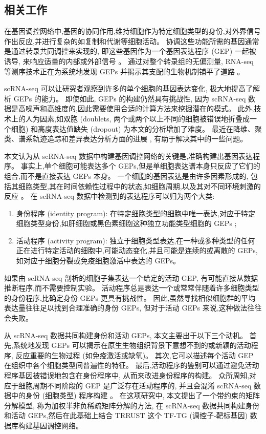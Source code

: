 \subsection{相关工作}
在基因调控网络中,基因的协同作用,维持细胞作为特定细胞类型的身份,对外界信号作出反应,并进行复杂的如复制和代谢等细胞活动。
协调这些功能所需的基因通常是通过转录共同调控来实现的,
即这些基因作为一个基因表达程序 (GEP) 一起被诱导,
来响应适量的内部或外部信号 。
通过对整个转录组的无偏测量, RNA-seq 等测序技术正在为系统地发现 GEPs 并揭示其支配的生物机制铺平了道路 。

scRNA-seq 可以让研究者观察到许多的单个细胞的基因表达变化,
极大地提高了解析 GEPs 的能力。
即使如此, GEPs 的构建仍然具有挑战性,
因为 scRNA-seq 数据是高噪声和高维度的,因此需要使用合适的计算方法来挖掘潜在的模式。
此外,技术上的人为因素,如双胞 (doublets, 两个或两个以上不同的细胞被错误地折叠成一个细胞) 和高度表达值缺失 (dropout) 为本文的分析增加了难度。
最近在降维、聚类、谱系轨迹追踪和差异表达分析方面的进展 ,
有助于解决其中的一些问题。

本文认为从 scRNA-seq 数据中构建基因调控网络的关键是,准确构建出基因表达程序。
事实上,单个细胞可能表达多个 GEPs,但是单细胞表达谱本身只反应了它们的组合,而不是直接表达 GEPs 本身。
一个细胞的基因表达是由许多因素形成的,
包括其细胞类型,其在时间依赖性过程中的状态,如细胞周期,以及其对不同环境刺激的反应 。
在 scRNA-seq 数据中检测到的表达程序可以归为两个大类:
\begin{enumerate}[label=(\arabic*),itemindent=2em]  %
    \item 身份程序 (identity program): 在特定细胞类型的细胞中唯一表达,对应于特定细胞类型身份,如肝细胞或黑色素细胞这种独立功能类型细胞的 GEPs ;
    \item 活动程序 (activity program): 独立于细胞类型表达,在一种或多种类型的任何正在进行特定活动的细胞中,可能动态变化,并且可能是连续的或离散的 GEPs,如对应于细胞分裂或免疫细胞激活中表达的 GEPs。
\end{enumerate}

如果由 scRNA-seq 剖析的细胞子集表达一个给定的活动 GEP,
有可能直接从数据推断程序,而不需要控制实验。
活动程序总是表达一个或常常伴随着许多细胞类型的身份程序,比确定身份 GEPs 更具有挑战性。
因此,虽然寻找相似细胞群的平均表达量往往足以找到合理准确的身份 GEPs,
但对于活动 GEPs 来说,这种做法往往会失败。

从 scRNA-seq 数据共同构建身份和活动 GEPs, 本文主要出于以下三个动机。
首先,系统地发现 GEPs 可以揭示在原生生物组织背景下意想不到的或新颖的活动程序,
反应重要的生物过程 (如免疫激活或缺氧)。
其次,它可以描述每个活动 GEP 在组织中各个细胞类型间普遍性的特征。
最后,活动程序的鉴别可以通过避免活动程序基因被错误地包含在身份程序中, 从而来改进身份程序的构建。
众所周知,对应于细胞周期不同阶段的 GEP 是广泛存在活动程序的,
并且会混淆 scRNA-seq 数据中的身份 (细胞类型) 程序构建 。
在这项研究中, 本文提出了一个带约束的矩阵分解模型, 称为加权半非负稀疏矩阵分解的方法,
在 scRNA-seq 数据共同构建身份和活动 GEPs,然后在此基础上结合 TRRUST 这个 TF-TG (调控子-靶标基因) 数据库构建基因调控网络。

